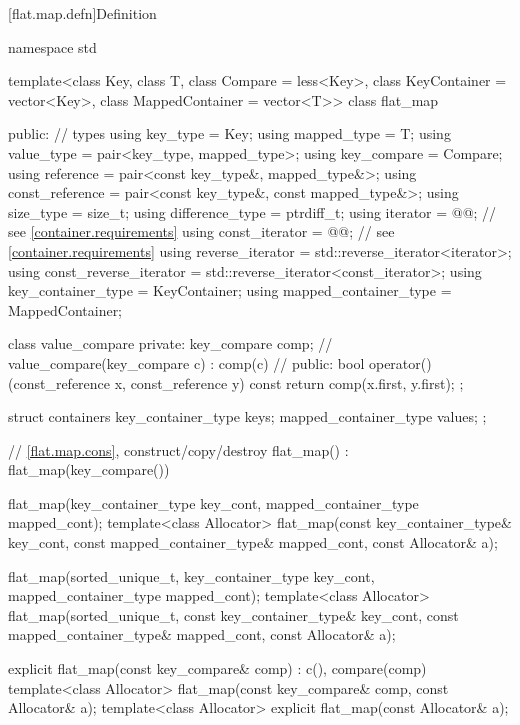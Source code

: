 [flat.map.defn]{Definition}

\begin{codeblock}
namespace std {
  template<class Key, class T, class Compare = less<Key>,
           class KeyContainer = vector<Key>, class MappedContainer = vector<T>>
  class flat_map {
  public:
    // types
    using key_type               = Key;
    using mapped_type            = T;
    using value_type             = pair<key_type, mapped_type>;
    using key_compare            = Compare;
    using reference              = pair<const key_type&, mapped_type&>;
    using const_reference        = pair<const key_type&, const mapped_type&>;
    using size_type              = size_t;
    using difference_type        = ptrdiff_t;
    using iterator               = @@; // see \ref{container.requirements}
    using const_iterator         = @@; // see \ref{container.requirements}
    using reverse_iterator       = std::reverse_iterator<iterator>;
    using const_reverse_iterator = std::reverse_iterator<const_iterator>;
    using key_container_type     = KeyContainer;
    using mapped_container_type  = MappedContainer;

    class value_compare {
    private:
      key_compare comp;                                 // \expos
      value_compare(key_compare c) : comp(c) { }        // \expos
    public:
      bool operator()(const_reference x, const_reference y) const {
        return comp(x.first, y.first);
      }
    };

    struct containers {
      key_container_type keys;
      mapped_container_type values;
    };

    // \ref{flat.map.cons}, construct/copy/destroy
    flat_map() : flat_map(key_compare()) { }

    flat_map(key_container_type key_cont, mapped_container_type mapped_cont);
    template<class Allocator>
      flat_map(const key_container_type& key_cont, const mapped_container_type& mapped_cont,
               const Allocator& a);

    flat_map(sorted_unique_t, key_container_type key_cont, mapped_container_type mapped_cont);
    template<class Allocator>
      flat_map(sorted_unique_t, const key_container_type& key_cont,
               const mapped_container_type& mapped_cont, const Allocator& a);

    explicit flat_map(const key_compare& comp)
      : c(), compare(comp) { }
    template<class Allocator>
      flat_map(const key_compare& comp, const Allocator& a);
    template<class Allocator>
      explicit flat_map(const Allocator& a);

}}
\end{codeblock}
